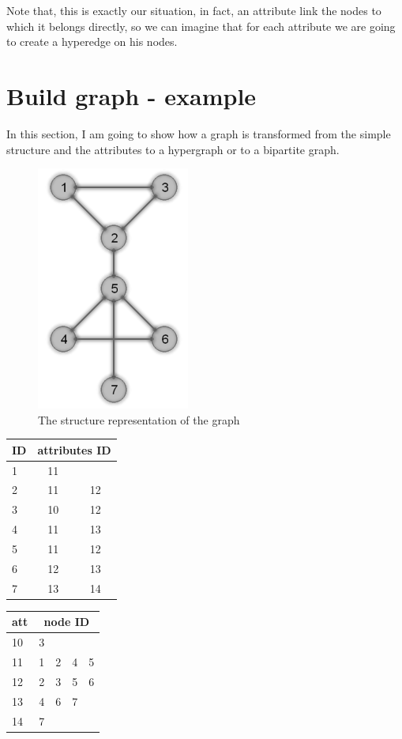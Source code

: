 \documentclass[epsfig,a4paper,11pt,titlepage,twoside,openany]{book}
\begin{document}
Note that, this is exactly our situation, in fact, an attribute link the nodes to which it belongs directly, so we can imagine that for each attribute we are going to create a hyperedge on his nodes.
%
%

\section{Build graph - example}
In this section, I am going to show how a graph is transformed from the simple structure and the attributes to a hypergraph or to a bipartite graph.\\
%
\begin{figure}[htp]
	\centering
	\includegraphics{images/7transform_str}
	\caption{The structure representation of the graph}
	\label{fig:7transform_str}
\end{figure}
%
%
\begin{multicols}{2}
	\begin{center}
		\begin{tabular}{|l|cc|}
		\hline
		ID&\multicolumn{2}{c|}{attributes ID}\\
		\hline
		1&11&\\
		2&11&12\\
		3&10&12\\
		4&11&13\\
		5&11&12\\
		6&12&13\\
		7&13&14\\
		\hline
		\end{tabular}
		\label{tab:7_ID_to_att}
		
		\begin{tabular}{|l|cccc|}
		\hline
		att&\multicolumn{4}{c|}{node ID}\\
		\hline
		10&3&&&\\
		11&1&2&4&5\\
		12&2&3&5&6\\
		13&4&6&7&\\
		14&7&&&\\
		\hline
		\end{tabular}
		\label{tab:7_att_to_ID}
	\end{center}
\end{multicols}
\end{document}
